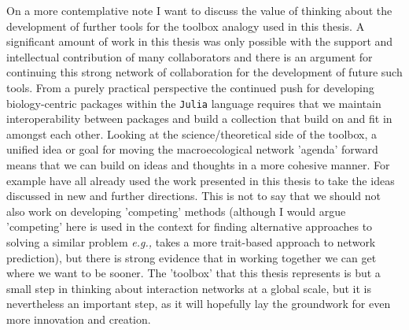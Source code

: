 On a more contemplative note I want to discuss the value of thinking about the development of further tools for the toolbox analogy used in this thesis. A significant amount of work in this thesis was only possible with the support and intellectual contribution of many collaborators and there is an argument for continuing this strong network of collaboration for the development of future such tools. From a purely practical perspective the continued push for developing biology-centric packages within the \texttt{Julia} language \cite{Roesch2021Julia} requires that we maintain interoperability between packages and build a collection that build on and fit in amongst each other. Looking at the science/theoretical side of the toolbox, a unified idea or goal for moving the macroecological network 'agenda' forward means that we can build on ideas and thoughts in a more cohesive manner. For example \cite{Dansereau2023Spatially, Catchen2023Improving, Banville2023What} have all already used the work presented in this thesis to take the ideas discussed in new and further directions. This is not to say that we should not also work on developing 'competing' methods (although I would argue 'competing' here is used in the context for finding alternative approaches to solving a similar problem \emph{e.g.,} \cite{Caron2022Addressing} takes a more trait-based approach to network prediction), but there is strong evidence that in working together we can get where we want to be sooner. The 'toolbox' that this thesis represents is but a small step in thinking about interaction networks at a global scale, but it is nevertheless an important step, as it will hopefully lay the groundwork for even more innovation and creation.



\endinput